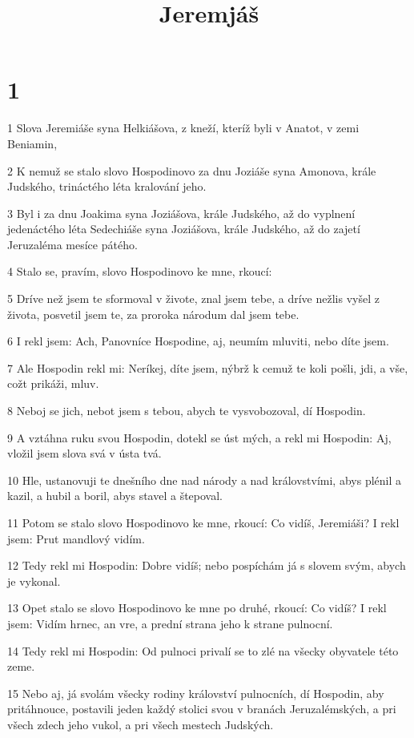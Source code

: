 

\title{Jeremjáš}

\chapter{1}

\par 1 Slova Jeremiáše syna Helkiášova, z kneží, kteríž byli v Anatot, v zemi Beniamin,
\par 2 K nemuž se stalo slovo Hospodinovo za dnu Joziáše syna Amonova, krále Judského, trináctého léta kralování jeho.
\par 3 Byl i za dnu Joakima syna Joziášova, krále Judského, až do vyplnení jedenáctého léta Sedechiáše syna Joziášova, krále Judského, až do zajetí Jeruzaléma mesíce pátého.
\par 4 Stalo se, pravím, slovo Hospodinovo ke mne, rkoucí:
\par 5 Dríve než jsem te sformoval v živote, znal jsem tebe, a dríve nežlis vyšel z života, posvetil jsem te, za proroka národum dal jsem tebe.
\par 6 I rekl jsem: Ach, Panovníce Hospodine, aj, neumím mluviti, nebo díte jsem.
\par 7 Ale Hospodin rekl mi: Neríkej, díte jsem, nýbrž k cemuž te koli pošli, jdi, a vše, cožt prikáži, mluv.
\par 8 Neboj se jich, nebot jsem s tebou, abych te vysvobozoval, dí Hospodin.
\par 9 A vztáhna ruku svou Hospodin, dotekl se úst mých, a rekl mi Hospodin: Aj, vložil jsem slova svá v ústa tvá.
\par 10 Hle, ustanovuji te dnešního dne nad národy a nad královstvími, abys plénil a kazil, a hubil a boril, abys stavel a štepoval.
\par 11 Potom se stalo slovo Hospodinovo ke mne, rkoucí: Co vidíš, Jeremiáši? I rekl jsem: Prut mandlový vidím.
\par 12 Tedy rekl mi Hospodin: Dobre vidíš; nebo pospíchám já s slovem svým, abych je vykonal.
\par 13 Opet stalo se slovo Hospodinovo ke mne po druhé, rkoucí: Co vidíš? I rekl jsem: Vidím hrnec, an vre, a prední strana jeho k strane pulnocní.
\par 14 Tedy rekl mi Hospodin: Od pulnoci privalí se to zlé na všecky obyvatele této zeme.
\par 15 Nebo aj, já svolám všecky rodiny království pulnocních, dí Hospodin, aby pritáhnouce, postavili jeden každý stolici svou v branách Jeruzalémských, a pri všech zdech jeho vukol, a pri všech mestech Judských.
